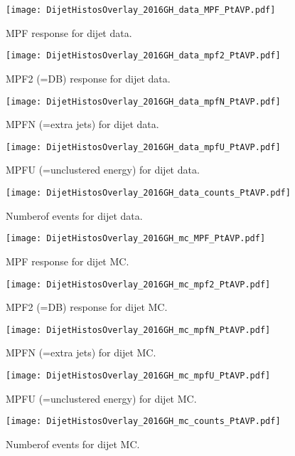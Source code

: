 \documentclass[landscape,10pt]{beamer} %
\begin{document}
\begin{figure}[htp]
\centering
\texttt{[image: DijetHistosOverlay\_2016GH\_data\_MPF\_PtAVP.pdf]}
\caption{MPF response for dijet data.}
\end{figure}
\begin{figure}[htp]
\centering
\texttt{[image: DijetHistosOverlay\_2016GH\_data\_mpf2\_PtAVP.pdf]}
\caption{MPF2 (=DB) response for dijet data.}
\end{figure}
\begin{figure}[htp]
\centering
\texttt{[image: DijetHistosOverlay\_2016GH\_data\_mpfN\_PtAVP.pdf]}
\caption{MPFN (=extra jets) for dijet data.}
\end{figure}
\begin{figure}[htp]
\centering
\texttt{[image: DijetHistosOverlay\_2016GH\_data\_mpfU\_PtAVP.pdf]}
\caption{MPFU (=unclustered energy) for dijet data.}
\end{figure}
\begin{figure}[htp]
\centering
\texttt{[image: DijetHistosOverlay\_2016GH\_data\_counts\_PtAVP.pdf]}
\caption{Numberof events for dijet data.}
\end{figure}

\begin{figure}[htp]
\centering
\texttt{[image: DijetHistosOverlay\_2016GH\_mc\_MPF\_PtAVP.pdf]}
\caption{MPF response for dijet MC.}
\end{figure}
\begin{figure}[htp]
\centering
\texttt{[image: DijetHistosOverlay\_2016GH\_mc\_mpf2\_PtAVP.pdf]}
\caption{MPF2 (=DB) response for dijet MC.}
\end{figure}
\begin{figure}[htp]
\centering
\texttt{[image: DijetHistosOverlay\_2016GH\_mc\_mpfN\_PtAVP.pdf]}
\caption{MPFN (=extra jets) for dijet MC.}
\end{figure}
\begin{figure}[htp]
\centering
\texttt{[image: DijetHistosOverlay\_2016GH\_mc\_mpfU\_PtAVP.pdf]}
\caption{MPFU (=unclustered energy) for dijet MC.}
\end{figure}
\begin{figure}[htp]
\centering
\texttt{[image: DijetHistosOverlay\_2016GH\_mc\_counts\_PtAVP.pdf]}
\caption{Numberof events for dijet MC.}
\end{figure}
\end{document}
